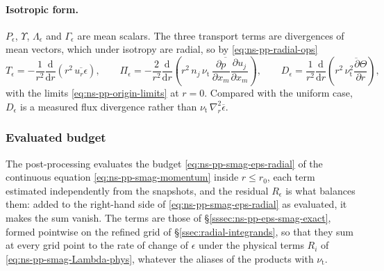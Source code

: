 \documentclass{article}
\begin{document}
\paragraph{Isotropic form.}
$P_\epsilon$, $\Upsilon$, $\Lambda_\epsilon$ and $\Gamma_\epsilon$ are mean
scalars. The three transport terms are divergences of mean vectors, which
under isotropy are radial, so by \eqref{eq:ns-pp-radial-ops}
\begin{equation}\label{eq:ns-pp-smag-radial-terms}
  T_\epsilon = -\frac{1}{r^2} \frac{\mathrm{d}}{\mathrm{d} r}\left( r^2\, \overline{u_r \epsilon} \right),
  \qquad
  \Pi_\epsilon = -\frac{2}{r^2} \frac{\mathrm{d}}{\mathrm{d} r}\left( r^2\, n_j\, \overline{\nu_{\mathrm{t}}\, \frac{\partial p}{\partial x_m} \frac{\partial u_j}{\partial x_m}} \right),
  \qquad
  D_\epsilon = \frac{1}{r^2} \frac{\mathrm{d}}{\mathrm{d} r}\left( r^2\, \overline{\nu_{\mathrm{t}}^2 \frac{\partial \Theta}{\partial r}} \right),
\end{equation}
with the limits \eqref{eq:ns-pp-origin-limits} at $r = 0$. Compared with the
uniform case, $D_\epsilon$ is a measured flux divergence rather than
$\nu_{\mathrm{t}}\, \nabla_r^2 \overline{\epsilon}$.

\subsubsection{Evaluated budget}\label{sssec:ns-pp-eps-smag-pp}
The post-processing evaluates the budget \eqref{eq:ns-pp-smag-eps-radial} of
the continuous equation \eqref{eq:ns-pp-smag-momentum} inside $r \le r_0$,
each term estimated independently from the snapshots, and the residual
$R_\epsilon$ is what balances them: added to the right-hand side of
\eqref{eq:ns-pp-smag-eps-radial} as evaluated, it makes the sum vanish. The
terms are those of \S\ref{sssec:ns-pp-eps-smag-exact}, formed pointwise on
the refined grid of \S\ref{ssec:radial-integrands}, so that they sum at
every grid point to the rate of change of $\epsilon$ under the physical
terms $R_i$ of \eqref{eq:ns-pp-smag-Lambda-phys}, whatever the aliases of
the products with $\nu_{\mathrm{t}}$.
\end{document}
